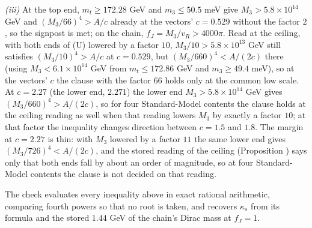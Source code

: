 \emph{(iii)} At the top end, $m_{t} \ge 172.28$ GeV and $m_{3} \le 50.5$ meV give $M_{3} > 5.8 \times 10^{14}$ GeV and $(M_{3}/66)^{4} > A/c$ already at the vectors' $c = 0.529$ without the factor $2$, so the signpost is met; on the chain, $f_{J} = M_{3}/v_{R} > 4000\pi$. Read at the ceiling, with both ends of (U) lowered by a factor $10$, $M_{3}/10 > 5.8 \times 10^{13}$ GeV still satisfies $(M_{3}/10)^{4} > A/c$ at $c = 0.529$, but $(M_{3}/660)^{4} < A/(2c)$ there (using $M_{3} < 6.1 \times 10^{14}$ GeV from $m_{t} \le 172.86$ GeV and $m_{3} \ge 49.4$ meV), so at the vectors' $c$ the clause with the factor $66$ holds only at the common low scale. At $c = 2.27$ (the lower end, $2.271$) the lower end $M_{3} > 5.8 \times 10^{14}$ GeV gives $(M_{3}/660)^{4} > A/(2c)$, so for four Standard-Model contents the clause holds at the ceiling reading as well when that reading lowers $M_{3}$ by exactly a factor $10$; at that factor the inequality changes direction between $c = 1.5$ and $1.8$. The margin at $c = 2.27$ is thin: with $M_{3}$ lowered by a factor $11$ the same lower end gives $(M_{3}/726)^{4} < A/(2c)$, and the stored reading of the ceiling (Proposition ) says only that both ends fall by about an order of magnitude, so at four Standard-Model contents the clause is not decided on that reading.

The check evaluates every inequality above in exact rational arithmetic, comparing fourth powers so that no root is taken, and recovers $\kappa_{s}$ from its formula and the stored $1.44$ GeV of the chain's Dirac mass at $f_{J} = 1$.
